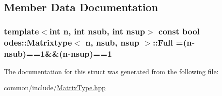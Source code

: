 \subsection{Member Data Documentation}
\hypertarget{structodes_1_1Matrixtype_a37c01995f06fa3c28fe86cc6a3ce62a3}{}
\subsubsection[{Full}]{\setlength{\rightskip}{0pt plus 5cm}template$<$int n, int nsub, int nsup$>$ const bool {\bf odes\+::\+Matrixtype}$<$ n, nsub, nsup $>$\+::Full =(n-\/nsub)==1\&\&(n-\/nsup)==1\hspace{0.3cm}{\ttfamily [static]}}\label{structodes_1_1Matrixtype_a37c01995f06fa3c28fe86cc6a3ce62a3}


The documentation for this struct was generated from the following file\+:\begin{DoxyCompactItemize}
\item 
common/include/\hyperlink{MatrixType_8hpp}{Matrix\+Type.\+hpp}\end{DoxyCompactItemize}
